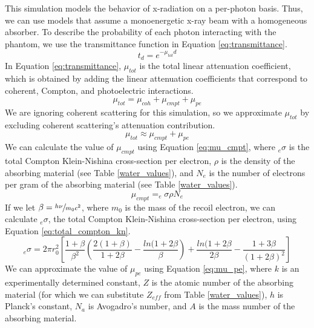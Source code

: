 \documentclass[12pt]{article} %
\begin{document}
This simulation models the behavior of x-radiation on a per-photon basis. Thus, we can use models that assume a monoenergetic x-ray beam with a homogeneous absorber. To describe the probability of each photon interacting with the phantom, we use the transmittance function in Equation \ref{eq:transmittance}.
\begin{equation}
t_d = e^{-\mu_{tot} d}
\label{eq:transmittance}
\end{equation}
In Equation \ref{eq:transmittance}, $\mu_{tot}$ is the total linear attenuation coefficient, which is obtained by adding the linear attenuation coefficients that correspond to coherent, Compton, and photoelectric interactions.
\begin{equation}
\mu_{tot} = \mu_{coh} + \mu_{cmpt} + \mu_{pe}
\label{eq:mu_total}
\end{equation}
We are ignoring coherent scattering for this simulation, so we approximate $\mu_{tot}$ by excluding coherent scattering's attenuation contribution.
\begin{equation}
\mu_{tot} \approx \mu_{cmpt} + \mu_{pe}
\label{eq:mu_total_approx}
\end{equation}
We can calculate the value of $\mu_{cmpt}$ using Equation \ref{eq:mu_cmpt}, where $_{e}\sigma$ is the total Compton Klein-Nishina cross-section per electron, $\rho$ is the density of the absorbing material (see Table \ref{water_values}), and $N_{e}$ is the number of electrons per gram of the absorbing material (see Table \ref{water_values}).
\begin{equation}
\mu_{cmpt} = _{e}\sigma\rho N_{e}
\label{eq:mu_cmpt}
\end{equation}
If we let $\beta = \sfrac{h\nu}{m_{0}c^{2}}$, where $m_{0}$ is the mass of the recoil electron, we can calculate $_{e}\sigma$, the total Compton Klein-Nishina cross-section per electron, using Equation \ref{eq:total_compton_kn}.
\begin{equation}
_{e}\sigma = 2\pi r_{0}^{2}\left[\frac{1+\beta}{\beta^{2}}\left(\frac{2(1+\beta)}{1+2\beta} - \frac{ln(1+2\beta}{\beta}\right) + \frac{ln(1+2\beta}{2\beta} - \frac{1+3\beta}{\left(1+2\beta\right)^{2}}
\label{eq:total_compton_kn}\right]
\end{equation}
We can approximate the value of $\mu_{pe}$ using Equation \ref{eq:mu_pe}, where $k$ is an experimentally determined constant, $Z$ is the atomic number of the absorbing material (for which we can substitute $Z_{eff}$ from Table \ref{water_values}), $h$ is Planck's constant, $N_{a}$ is Avogadro's number, and $A$ is the mass number of the absorbing material.
\end{document}
